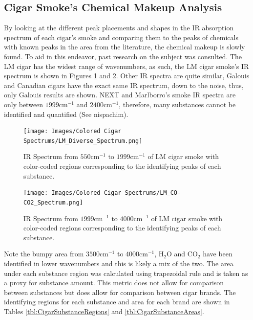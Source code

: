 \documentclass[reprint,amsmath,amssymb,aps, prl]{revtex4-2}
\begin{document}
\subsection{Cigar Smoke's Chemical Makeup Analysis}
By looking at the different peak placements and shapes in the IR absorption spectrum of each cigar's smoke and comparing them to the peaks of chemicals with known peaks in the area from the literature, 
the chemical makeup is slowly found. To aid in this endeavor, past research
on the subject was consulted. The LM cigar has the widest range of wavenumbers, as such, the LM cigar smoke's IR spectrum is shown in Figures \ref{fig:DiverseLM} and \ref{fig:COCO2LM}. Other IR spectra are quite similar, Galouis and Canadian cigars have the exact same IR spectrum, down to the noise, thus, only Galouis results are shown. NEXT and Marlborro's smoke IR spectra are only between $1999\text{cm}^{-1}$ and $2400\text{cm}^{-1}$, therefore, many substances cannot be identified and quantified (See nispachim).
\begin{figure}
    \texttt{[image: Images/Colored Cigar Spectrums/LM\_Diverse\_Spectrum.png]} 
    \caption{IR Spectrum from $550 \text{cm}^{-1}$ to $1999 \text{cm}^{-1}$ of LM cigar smoke with color-coded regions corresponding to the identifying peaks of each substance.}
    \label{fig:DiverseLM}
\end{figure}

\begin{figure}
    \texttt{[image: Images/Colored Cigar Spectrums/LM\_CO-CO2\_Spectrum.png]} 
    \caption{IR Spectrum from $1999 \text{cm}^{-1}$ to $4000 \text{cm}^{-1}$ of LM cigar smoke with color-coded regions corresponding to the identifying peaks of each substance.}
    \label{fig:COCO2LM}
\end{figure}
Note the bumpy area from $3500 \text{cm}^{-1}$ to $4000 \text{cm}^{-1}$, $\text{H}_{2}\text{O}$ and $\text{CO}_{2}$ have been identified in lower wavenumbers and this is likely a mix of the two.
The area under each substance region was calculated using trapezoidal rule 
and is taken as a proxy for substance amount. This metric does not allow for comparison between substances but does allow for comparison between cigar brands.
The identifying regions for each substance and area for each brand are shown in Tables \ref{tbl:CigarSubstanceRegions} and \ref{tbl:CigarSubstanceAreas}. %
\end{document}
